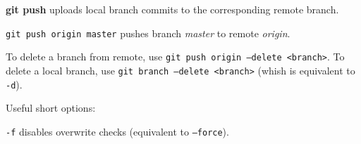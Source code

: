 %

\textbf{git push} uploads local branch commits to the corresponding remote branch.

\texttt{git push origin master} pushes branch \emph{master} to remote \emph{origin}.

To delete a branch from remote, use \texttt{git push origin --delete <branch>}.
To delete a local branch, use \texttt{git branch --delete <branch>} (whish is equivalent to \texttt{-d}).

Useful short options:
\begin{compactenum}
\item [\texttt{-f}] disables overwrite checks (equivalent to \texttt{--force}).
\end{compactenum}

%